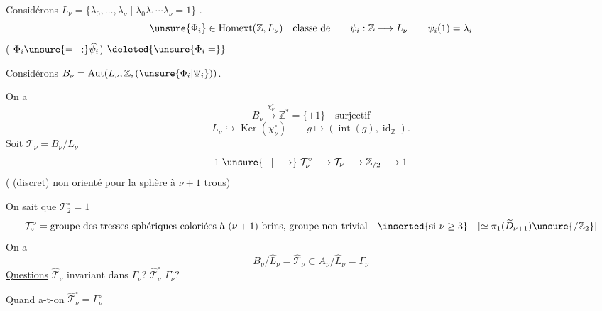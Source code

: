 Considérons $L_\nu=\{\lambda_0,\ldots,\lambda_\nu\mid\lambda_0\lambda_1\cdots\lambda_\nu=1\}$ .
\[
\unsure{\Phi_i}\in\operatorname{Homext}(\mathbb Z,L_\nu)\quad\text{classe de}
\qquad\psi_i:\mathbb Z\longrightarrow L_\nu\qquad\psi_i(1)=\lambda_i
\]
( $\Phi_i\unsure{=|:}\widehat{\psi_i}$) $\deleted{\unsure{\Phi_i=}}$

Considérons $B_\nu=\operatorname{Aut}(L_\nu,\mathbb Z,(\unsure{\Phi_i|\Psi_i}))$.

On a
\[
B_\nu\xrightarrow{\chi_\nu^\circ}\mathbb Z^*=\{\pm1\}\quad\text{surjectif}
\]
\[
L_\nu\hookrightarrow\operatorname{Ker}(\chi_\nu^\circ)\qquad g\longmapsto(\operatorname{int}(g),\operatorname{id}_{\mathbb Z}).
\]
Soit $\mathcal T_\nu=B_\nu/L_\nu$
\[
1\;\unsure{-|\longrightarrow}\;\mathcal T_\nu^\circ\longrightarrow\mathcal T_\nu\longrightarrow\mathbb Z_{/2}\longrightarrow1
\]
( (discret) non orienté pour la sphère à $\nu+1$ trous)

On sait que $\mathcal T_2^\circ=1$
\[
\mathcal T_\nu^\circ=\text{groupe des tresses sphériques coloriées à $(\nu+1)$ brins, groupe non trivial}
\quad\inserted{\text{si }\nu\geq3}\quad
[\simeq\pi_1(\widetilde D_{\nu+1})\unsure{/\mathbb Z_2}]
\]
On a
\[
\overline B_\nu/\widehat L_\nu=\widehat{\mathcal T}_\nu\subset A_\nu/\widehat L_\nu=\Gamma_\nu
\]
\uline{Questions} $\widehat{\mathcal T}_\nu$ invariant dans $\Gamma_\nu$? $\widehat{\mathcal T}_\nu^\circ$  $\Gamma_\nu^\circ$?

Quand a-t-on  $\widehat{\mathcal T}_\nu^\circ=\Gamma_\nu^\circ$

